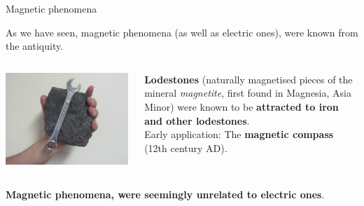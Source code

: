 %
%
%

\begin{frame}{Magnetic phenomena}

As we have seen,
magnetic phenomena (as well as electric ones), were known from the antiquity. \\
\vspace{0.3cm}

\begin{columns}
  \begin{column}{0.50\textwidth}
    \includegraphics[width=0.99\textwidth]{./images/photos/lodestone_1.jpg}
  \end{column}
  \begin{column}{0.50\textwidth}
     {\bf Lodestones} (naturally magnetised pieces of the mineral {\em magnetite}, first found in Magnesia, Asia Minor)
     were known to be {\bf attracted to iron and other lodestones}.\\
     \vspace{0.3cm}
     Early application: The {\bf magnetic compass} (12th century AD).\\
  \end{column}
\end{columns}

\vspace{0.3cm}
{\bf Magnetic phenomena, were seemingly unrelated to electric ones}.\\

\end{frame}


%
%
%

